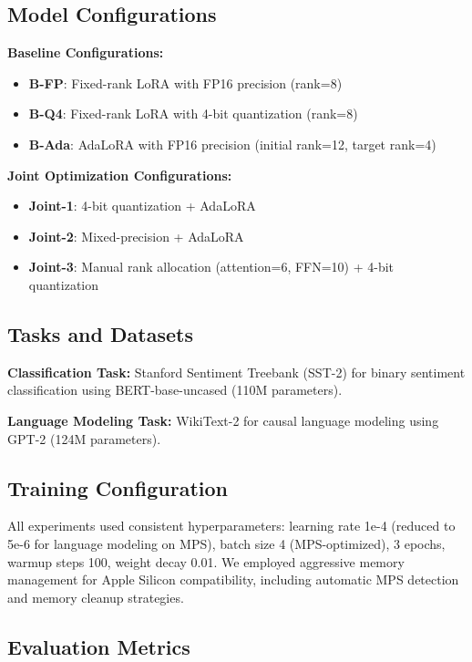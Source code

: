 \documentclass[11pt,a4paper]{article}
\begin{document}
\subsection{Model Configurations}

\textbf{Baseline Configurations:}
\begin{itemize}
    \item \textbf{B-FP}: Fixed-rank LoRA with FP16 precision (rank=8)
    \item \textbf{B-Q4}: Fixed-rank LoRA with 4-bit quantization (rank=8)
    \item \textbf{B-Ada}: AdaLoRA with FP16 precision (initial rank=12, target rank=4)
\end{itemize}

\textbf{Joint Optimization Configurations:}
\begin{itemize}
    \item \textbf{Joint-1}: 4-bit quantization + AdaLoRA
    \item \textbf{Joint-2}: Mixed-precision + AdaLoRA
    \item \textbf{Joint-3}: Manual rank allocation (attention=6, FFN=10) + 4-bit quantization
\end{itemize}

\subsection{Tasks and Datasets}

\textbf{Classification Task:} Stanford Sentiment Treebank (SST-2) \cite{socher2013recursive} for binary sentiment classification using BERT-base-uncased (110M parameters).

\textbf{Language Modeling Task:} WikiText-2 \cite{merity2016pointer} for causal language modeling using GPT-2 (124M parameters).

\subsection{Training Configuration}

All experiments used consistent hyperparameters: learning rate 1e-4 (reduced to 5e-6 for language modeling on MPS), batch size 4 (MPS-optimized), 3 epochs, warmup steps 100, weight decay 0.01. We employed aggressive memory management for Apple Silicon compatibility, including automatic MPS detection and memory cleanup strategies.

\subsection{Evaluation Metrics}
\end{document}
